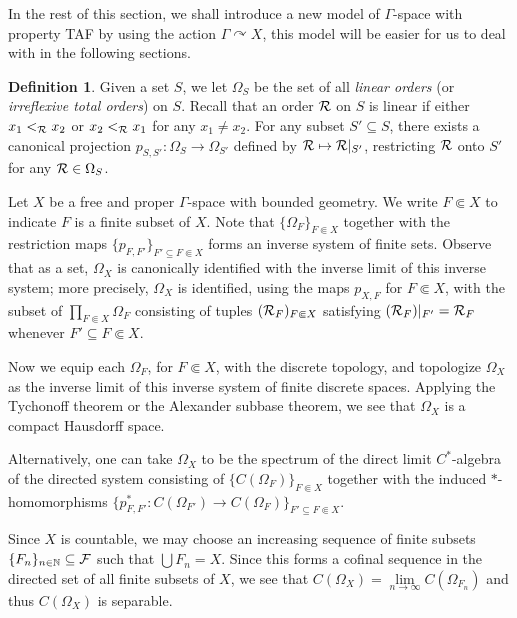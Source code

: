 \documentclass[11pt]{article}
\theoremstyle{definition}
\newtheorem{Def}{Definition}[section]
\theoremstyle{plain}
\def\IN{\mathbb N}\def\IR{\mathbb R}\def\IE{\mathbb E}\def\IC{\mathbb C}\def\IL{\mathbb L}\def\IQ{\mathbb Q}\def\IA{\mathbb A}\def\IZ{\mathbb Z}
\def\Ga{\Gamma}
\def\car{\curvearrowright}
\begin{document}
In the rest of this section, we shall introduce a new model of $\Ga$-space with property TAF by using the action $\Ga\car X$, this model will be easier for us to deal with in the following sections.

\begin{Def}\label{TAF space}
    Given a set $S$, we let $\Omega_S$ be the set of all \emph{linear orders} (or \emph{irreflexive total orders}) on $S$. Recall that an order $\mathcal R$ on $S$ is linear if either $x_1<_\mathcal R x_2$ or $x_2<_\mathcal R x_1$ for any $x_1\ne x_2$. For any subset $S' \subseteq S$, there exists a canonical projection $p_{S,S'}:\Omega_{S}\to\Omega_{S'}$ defined by $\mathcal R\mapsto \mathcal R|_{S'}$, restricting $\mathcal R$ onto $S'$ for any $\mathcal R\in\Omega_{S}$. 

    Let $X$ be a free and proper $\Ga$-space with bounded geometry. We write $F \Subset X$ to indicate $F$ is a finite subset of $X$. 
    Note that $\{ \Omega_F \}_{F \Subset X}$ together with the restriction maps $\{ p_{F, F'} \}_{F' \subseteq F \Subset X}$ forms an inverse system of finite sets. 
    Observe that as a set, $\Omega_X$ is canonically identified with the inverse limit of this inverse system; more precisely, $\Omega_X$ is identified, using the maps $p_{X, F}$ for $F \Subset X$, with the subset of $\prod_{F \Subset X} \Omega_F$ consisting of tuples $(\mathcal R_F)_{F \Subset X}$ satisfying $(\mathcal R_F)|_{F'} = \mathcal R_F$ whenever $F' \subseteq F \Subset X$. 

    Now we equip each $\Omega_F$, for $F \Subset X$, with the discrete topology, and topologize $\Omega_X$ as the inverse limit of this inverse system of finite discrete spaces. 
    Applying the Tychonoff theorem or the Alexander subbase theorem, we see that $\Omega_X$ is a compact Hausdorff space. 
\end{Def}


Alternatively, one can take $\Omega_X$ to be the spectrum of the direct limit $C^*$-algebra of the directed system consisting of $\{ C(\Omega_F) \}_{F \Subset X}$ together with the induced $*$-homomorphisms $\{ p^*_{F, F'} \colon  C(\Omega_{F'}) \to C(\Omega_F) \}_{F' \subseteq F \Subset X}$. 

Since $X$ is countable, we may choose an increasing sequence of finite subsets $\{F_n\}_{n\in\IN}\subseteq\F$ such that $\bigcup F_n=X$. Since this forms a cofinal sequence in the directed set of all finite subsets of $X$, we see that $C(\Omega_X) = \lim\limits_{n\to\infty}C(\Omega_{F_n})$ and thus $C(\Omega_X)$ is separable. 
\end{document}
